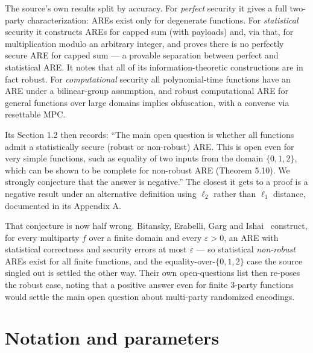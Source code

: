 \documentclass{conjura-conjecture}
\newcommand{\eps}{\varepsilon}
\begin{document}
The source's own results split by accuracy. For \emph{perfect} security
it gives a full two-party characterization: AREs exist only for
degenerate functions. For \emph{statistical} security it constructs AREs
for capped sum (with payloads) and, via that, for multiplication modulo
an arbitrary integer, and proves there is no perfectly secure ARE for
capped sum --- a provable separation between perfect and statistical ARE\@.
It notes that all of its information-theoretic constructions are in fact
robust. For \emph{computational} security all polynomial-time functions
have an ARE under a bilinear-group assumption, and robust computational
ARE for general functions over large domains implies obfuscation, with a
converse via resettable MPC\@.

Its Section 1.2 then records: ``The main open question is whether all
functions admit a statistically secure (robust or non-robust) ARE\@. This
is open even for very simple functions, such as equality of two inputs
from the domain $\{0,1,2\}$, which can be shown to be complete for
non-robust ARE (Theorem 5.10). We strongly conjecture that the answer is
negative.'' The closest it gets to a proof is a negative result under an
alternative definition using $\ell_{2}$ rather than $\ell_{1}$ distance,
documented in its Appendix A.

That conjecture is now half wrong. Bitansky, Erabelli, Garg and
Ishai~\cite{BEGI25} construct, for every multiparty $f$ over a finite
domain and every $\eps > 0$, an ARE with statistical correctness and
security errors at most $\eps$ --- so statistical \emph{non-robust} AREs
exist for all finite functions, and the equality-over-$\{0,1,2\}$ case
the source singled out is settled the other way. Their own open-questions
list then re-poses the robust case, noting that a positive answer even
for finite $3$-party functions would settle the main open question about
multi-party randomized encodings.

\section{Notation and parameters}\label{sec:notation}
\end{document}
